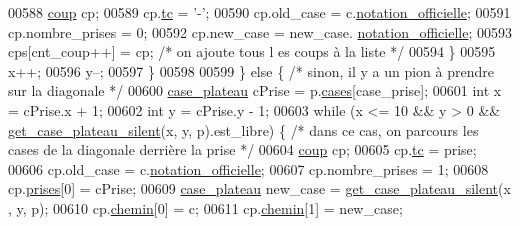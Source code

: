 \begin{DoxyCode}
00588                                         \hyperlink{structcoup}{coup} cp;
00589                                         cp.\hyperlink{structcoup_aa33da004dccb192cb33bc00c26c6e859}{tc} = \textcolor{charliteral}{'-'};
00590                                         cp.old\_case = c.\hyperlink{structcase__plateau_ad510581b324604a9cf685cbb769a421a}{notation_officielle};
00591                                         cp.nombre\_prises = 0;
00592                                         cp.new\_case = new\_case.
      \hyperlink{structcase__plateau_ad510581b324604a9cf685cbb769a421a}{notation_officielle};
00593                                         cps[cnt\_coup++] = cp; \textcolor{comment}{/* on ajoute tous l
      es coups à la liste */}
00594                                 \}
00595                                 x++;
00596                                 y--;
00597                         \}
00598 
00599                 \} \textcolor{keywordflow}{else} \{ \textcolor{comment}{/* sinon, il y a un pion à prendre sur la diagonale */}
00600                         \hyperlink{structcase__plateau}{case_plateau} cPrise = p.\hyperlink{structplateau_a6afaa60f594542e0d742b0c6d3223392}{cases}[case\_prise];
00601                         \textcolor{keywordtype}{int} x = cPrise.x + 1;
00602                         \textcolor{keywordtype}{int} y = cPrise.y - 1;
00603                         \textcolor{keywordflow}{while} (x <= 10 && y > 0 && \hyperlink{plateau_8h_a60a8f706865d0ae9087f8d65d4667655}{get_case_plateau_silent}(x, y, 
      p).est\_libre) \{ \textcolor{comment}{/* dans ce cas, on parcours les cases de la diagonale derrière la
       prise */}
00604                                 \hyperlink{structcoup}{coup} cp;
00605                                 cp.\hyperlink{structcoup_aa33da004dccb192cb33bc00c26c6e859}{tc} = prise;
00606                                 cp.old\_case = c.\hyperlink{structcase__plateau_ad510581b324604a9cf685cbb769a421a}{notation_officielle};
00607                                 cp.nombre\_prises = 1;
00608                                 cp.\hyperlink{structcoup_ae19b3a66d3f4e66b8f69a38e4005f44a}{prises}[0] = cPrise;
00609                                 \hyperlink{structcase__plateau}{case_plateau} new\_case = \hyperlink{plateau_8h_a60a8f706865d0ae9087f8d65d4667655}{get_case_plateau_silent}(x
      , y, p);
00610                                 cp.\hyperlink{structcoup_aa66b88eb8140c2f459ac92fad0796510}{chemin}[0] = c;
00611                                 cp.\hyperlink{structcoup_aa66b88eb8140c2f459ac92fad0796510}{chemin}[1] = new\_case;

\end{DoxyCode}
